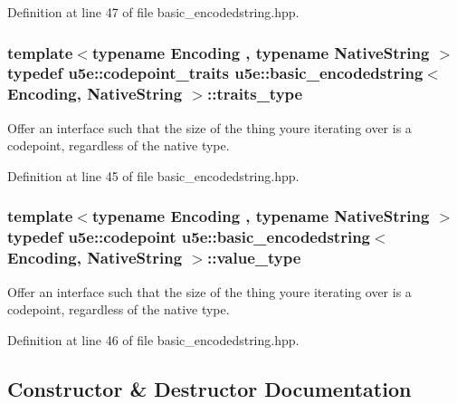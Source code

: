 Definition at line 47 of file basic\+\_\+encodedstring.\+hpp.

\subsubsection[{\texorpdfstring{traits\+\_\+type}{traits_type}}]{\setlength{\rightskip}{0pt plus 5cm}template$<$typename Encoding , typename Native\+String $>$ typedef {\bf u5e\+::codepoint\+\_\+traits} {\bf u5e\+::basic\+\_\+encodedstring}$<$ Encoding, Native\+String $>$\+::{\bf traits\+\_\+type}}\hypertarget{classu5e_1_1basic__encodedstring_a3ac9c7e8b96dae6342a47ab933e285ca}{}\label{classu5e_1_1basic__encodedstring_a3ac9c7e8b96dae6342a47ab933e285ca}
Offer an interface such that the size of the thing you\textquotesingle{}re iterating over is a codepoint, regardless of the native type. 

Definition at line 45 of file basic\+\_\+encodedstring.\+hpp.

\subsubsection[{\texorpdfstring{value\+\_\+type}{value_type}}]{\setlength{\rightskip}{0pt plus 5cm}template$<$typename Encoding , typename Native\+String $>$ typedef {\bf u5e\+::codepoint} {\bf u5e\+::basic\+\_\+encodedstring}$<$ Encoding, Native\+String $>$\+::{\bf value\+\_\+type}}\hypertarget{classu5e_1_1basic__encodedstring_a958081aa18370a191d00b33032a203bc}{}\label{classu5e_1_1basic__encodedstring_a958081aa18370a191d00b33032a203bc}
Offer an interface such that the size of the thing you\textquotesingle{}re iterating over is a codepoint, regardless of the native type. 

Definition at line 46 of file basic\+\_\+encodedstring.\+hpp.



\subsection{Constructor \& Destructor Documentation}
